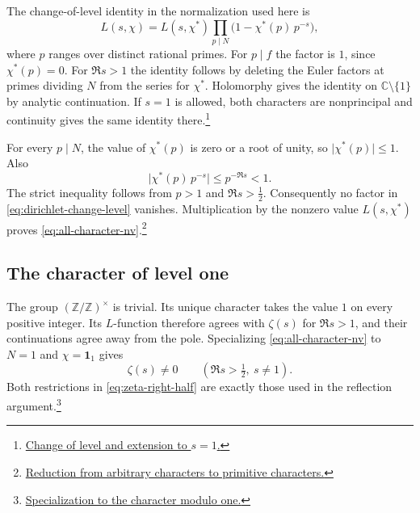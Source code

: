 The change-of-level identity in the normalization used here is
\begin{equation}
\label{eq:dirichlet-change-level}
     L(s,\chi)=L(s,\chi^*)\prod_{p\mid N}
                     \bigl(1-\chi^*(p)\,p^{-s}\bigr),
\end{equation}
where \(p\) ranges over distinct rational primes. For \(p\mid f\) the
factor is \(1\), since \(\chi^*(p)=0\). For \(\Re s>1\) the identity
follows by deleting the Euler factors at primes dividing \(N\) from
the series for \(\chi^*\). Holomorphy gives the identity on
\(\mathbb C\setminus\{1\}\) by analytic continuation. If \(s=1\) is
allowed, both characters are nonprincipal and continuity gives the same
identity there.\footnote{\href{https://github.com/leanprover-community/mathlib4/blob/v4.33.1/Mathlib/NumberTheory/LSeries/DirichletContinuation.lean\#L125-L162}{Change of level and extension to \(s=1\).}}

For every \(p\mid N\), the value of \(\chi^*(p)\) is zero or a root of
unity, so \(\lvert\chi^*(p)\rvert\le1\). Also
\[
       \lvert\chi^*(p)\,p^{-s}\rvert
       \le p^{-\Re s}<1.
\]
The strict inequality follows from \(p>1\) and \(\Re s>\tfrac12\).
Consequently no factor in \eqref{eq:dirichlet-change-level} vanishes.
Multiplication by the nonzero value \(L(s,\chi^*)\) proves
\eqref{eq:all-character-nv}.\footnote{\href{https://github.com/Deicyde/riemann-hypothesis/blob/40e56bab/src/Development/AutomorphicArithmetic/CharacterBoxes/Imprimitive.lean\#L5-L35}{Reduction from arbitrary characters to primitive characters.}}

\subsection{The character of level one}
\label{sec:level-one-specialization}

The group \((\mathbb Z/\mathbb Z)^\times\) is trivial. Its unique
character takes the value \(1\) on every positive integer. Its
\(L\)-function therefore agrees with \(\zeta(s)\) for \(\Re s>1\),
and their continuations agree away from the pole. Specializing
\eqref{eq:all-character-nv} to \(N=1\) and \(\chi=\mathbf 1_1\)
gives
\begin{equation}
\label{eq:zeta-right-half}
             \zeta(s)\ne0
             \qquad(\Re s>\tfrac12,\ s\ne1).
\end{equation}
Both restrictions in \eqref{eq:zeta-right-half} are exactly those used in
the reflection argument.\footnote{\href{https://github.com/Deicyde/riemann-hypothesis/blob/40e56bab/src/Formalism/GammaFactorNonvanishing/CritLine.lean\#L29-L32}{Specialization to the character modulo one.}}

